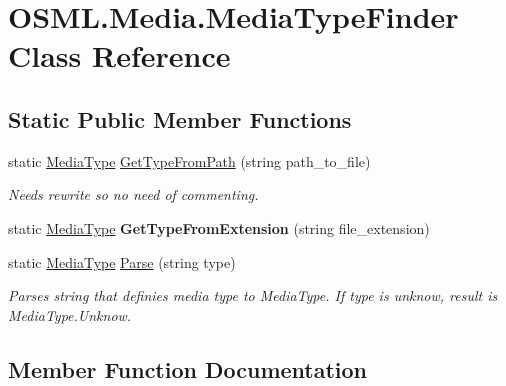 \hypertarget{classOSML_1_1Media_1_1MediaTypeFinder}{}\section{O\+S\+M\+L.\+Media.\+Media\+Type\+Finder Class Reference}
\label{classOSML_1_1Media_1_1MediaTypeFinder}
\subsection*{Static Public Member Functions}
\begin{DoxyCompactItemize}
\item 
\mbox{\label{classOSML_1_1Media_1_1MediaTypeFinder_a4e89de7a4472d9c643e2e05b9dd7c782}} 
static \mbox{\hyperlink{namespaceOSML_1_1Media_aa3e4261aa5181fcc93920ffe409e8b02}{Media\+Type}} \mbox{\hyperlink{classOSML_1_1Media_1_1MediaTypeFinder_a4e89de7a4472d9c643e2e05b9dd7c782}{Get\+Type\+From\+Path}} (string path\+\_\+to\+\_\+file)
\begin{DoxyCompactList}\small\item\em Needs rewrite so no need of commenting. \end{DoxyCompactList}\item 
\mbox{\label{classOSML_1_1Media_1_1MediaTypeFinder_afa3ff1c7c0edc7d0e6af80a8c6456cc6}} 
static \mbox{\hyperlink{namespaceOSML_1_1Media_aa3e4261aa5181fcc93920ffe409e8b02}{Media\+Type}} {\bfseries Get\+Type\+From\+Extension} (string file\+\_\+extension)
\item 
static \mbox{\hyperlink{namespaceOSML_1_1Media_aa3e4261aa5181fcc93920ffe409e8b02}{Media\+Type}} \mbox{\hyperlink{classOSML_1_1Media_1_1MediaTypeFinder_a2a279b05293f95377b811e4cca867820}{Parse}} (string type)
\begin{DoxyCompactList}\small\item\em Parses string that definies media type to Media\+Type. If type is unknow, result is Media\+Type.\+Unknow. \end{DoxyCompactList}\end{DoxyCompactItemize}


\subsection{Member Function Documentation}
\mbox{\label{classOSML_1_1Media_1_1MediaTypeFinder_a2a279b05293f95377b811e4cca867820}} 
